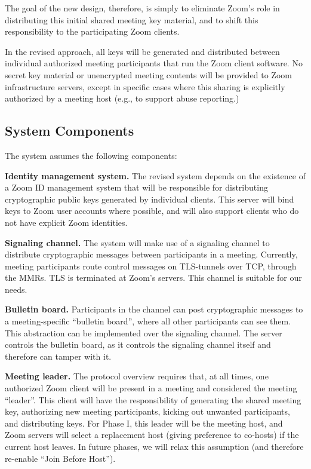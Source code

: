 The goal of the new design, therefore, is simply to eliminate Zoom's role in distributing this initial shared meeting key material, and to shift this responsibility to the participating Zoom clients.

In the revised approach, all keys will be generated and distributed between individual authorized meeting participants that run the Zoom client software. No secret key material or unencrypted meeting contents will be provided to Zoom infrastructure servers, except in specific cases where this sharing is explicitly authorized by a meeting host (e.g., to support abuse reporting.)

\subsection{System Components}
\label{subsec:comp}

The system assumes the following components:
\begin{description}
\item {\bf Identity management system.} The revised system depends on the existence of a Zoom ID management system that will be responsible for distributing cryptographic public keys generated by individual clients. This server will bind keys to Zoom user accounts where possible, and will also support clients who do not have explicit Zoom identities.

\item {\bf Signaling channel.} The system will make use of a signaling channel to distribute cryptographic messages between participants in a meeting. Currently, meeting participants route control messages on TLS-tunnels over TCP, through the MMRs. TLS is terminated at Zoom's servers. This channel is suitable for our needs.

\item {\bf Bulletin board.} Participants in the channel can post cryptographic messages to a meeting-specific ``bulletin board'', where all other participants can see them. This abstraction can be implemented over the signaling channel. The server controls the bulletin board, as it controls the signaling channel itself and therefore can tamper with it.

\item {\bf Meeting leader.} The protocol overview requires that, at all times, one authorized Zoom client will be present in a meeting and considered the meeting ``leader''. This client will have the responsibility of generating the shared meeting key, authorizing new meeting participants, kicking out unwanted participants, and distributing keys. For Phase I, this leader will be the meeting host, and Zoom servers will select a replacement host (giving preference to co-hosts) if the current host leaves. In future phases, we will relax this assumption (and therefore re-enable ``Join Before Host'').

\end{description}

